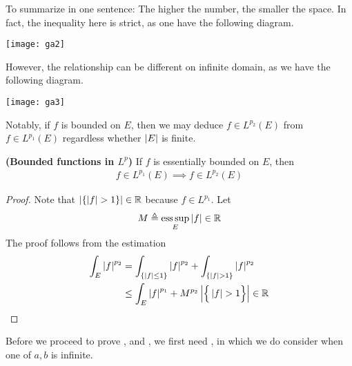 \documentclass{report}
\begin{document}
\begin{mdframed}
To summarize  in one sentence: The higher the number, the smaller the space.  In fact, the inequality here is strict, as one have the following diagram.  
\begin{center}
   \begin{minipage}{0.9\linewidth}  
       \centering
       \texttt{[image: ga2]}
   \end{minipage}
\end{center}
However, the relationship can be different on infinite domain, as we have the following diagram.  
\begin{center}
   \begin{minipage}{0.9\linewidth}  
       \centering
       \texttt{[image: ga3]}
   \end{minipage}
\end{center}
Notably, if $f$ is bounded on $E$, then we may deduce  $f \in L^{p_2}(E)$ from $f \in L^{p_1}(E)$ regardless whether $\left|E\right|$ is finite.
\end{mdframed}
\begin{theorem}
\textbf{(Bounded functions in $L^p$)} If $f$ is essentially bounded on  $E$, then 
\begin{align*}
f\in L^{p_1}(E) \implies  f\in L^{p_2}(E)
\end{align*}
\end{theorem}
\begin{proof}
Note that $\abso{\set{\abso{f}>1}}\inr$ because $f\in L^{p_1}$. Let 
\begin{align*}
M\triangleq \operatorname*{ess\,sup}_E \left|f\right| \in\mathbb{R}
\end{align*}
The proof follows from the estimation 
 \begin{align*}
\int_E \abso{f}^{p_2}&= \int_{\set{\abso{f}\leq 1}} \abso{f}^{p_2} + \int_{\set{\abso{f}>1}} \abso{f}^{p_2}\\
&\leq \int_E \abso{f}^{p_1}+ M^{p_2} \abso{\bset{\abso{f}>1}} \inr
\end{align*}
\end{proof}
\begin{mdframed}
  Before we proceed to prove ,   and , we first need  , in which we do consider when one of  $a,b$ is infinite.  
\end{mdframed}
\end{document}
